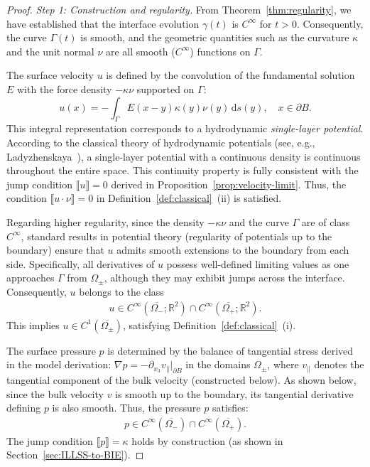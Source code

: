 \documentclass{article}
\theoremstyle{remark}
\theoremstyle{definition}
\numberwithin{equation}{section}
\begin{document}
\begin{proof}
    \textit{Step 1: Construction and regularity.}
    From Theorem~\ref{thm:regularity}, we have established that the interface evolution $\gamma(t)$ is $C^\infty$ for $t > 0$.
    Consequently, the curve $\Gamma(t)$ is smooth, and the geometric quantities such as the curvature $\kappa$ and the unit normal $\nu$ are all smooth ($C^\infty$) functions on $\Gamma$.
    
    The surface velocity $u$ is defined by the convolution of the fundamental solution $E$ with the force density $-\kappa\nu$ supported on $\Gamma$:
    \[
        u(x) = -\int_\Gamma E(x-y) \kappa(y)\nu(y) \,\mathrm{d}s(y), \quad x \in \partial B.
    \]
    This integral representation corresponds to a hydrodynamic \textit{single-layer potential}.
    According to the classical theory of hydrodynamic potentials (see, e.g., Ladyzhenskaya~\cite[Chapter~3, Section~2]{ladyzhenskaya1969mathematical}), a single-layer potential with a continuous density is continuous throughout the entire space.
    This continuity property is fully consistent with the jump condition $\llbracket u \rrbracket = 0$ derived in Proposition~\ref{prop:velocity-limit}.
    Thus, the condition $\llbracket u \cdot \nu \rrbracket = 0$ in Definition~\ref{def:classical}~(ii) is satisfied.

    Regarding higher regularity, since the density $-\kappa\nu$ and the curve $\Gamma$ are of class $C^\infty$, standard results in potential theory (regularity of potentials up to the boundary) ensure that $u$ admits smooth extensions to the boundary from each side.
    Specifically, all derivatives of $u$ possess well-defined limiting values as one approaches $\Gamma$ from $\Omega_\pm$, although they may exhibit jumps across the interface.
    Consequently, $u$ belongs to the class
    \begin{align*}
        u \in C^\infty(\overline{\Omega_-}; \mathbb{R}^2) \cap C^\infty(\overline{\Omega_+}; \mathbb{R}^2).
    \end{align*}
    This implies $u \in C^1(\overline{\Omega_\pm})$, satisfying Definition~\ref{def:classical}~(i).

    The surface pressure $p$ is determined by the balance of tangential stress derived in the model derivation: $\nabla p = -\partial_{x_3} v_\parallel|_{\partial B}$ in the domains $\Omega_\pm$, where $v_\parallel$ denotes the tangential component of the bulk velocity (constructed below).
    As shown below, since the bulk velocity $v$ is smooth up to the boundary, its tangential derivative defining $p$ is also smooth.
    Thus, the pressure $p$ satisfies:
    \begin{align*}
        p \in C^\infty(\overline{\Omega_-}) \cap C^\infty(\overline{\Omega_+}).
    \end{align*}
    The jump condition $\llbracket p \rrbracket = \kappa$ holds by construction (as shown in Section~\ref{sec:ILLSS-to-BIE}).


\end{proof}
\end{document}
